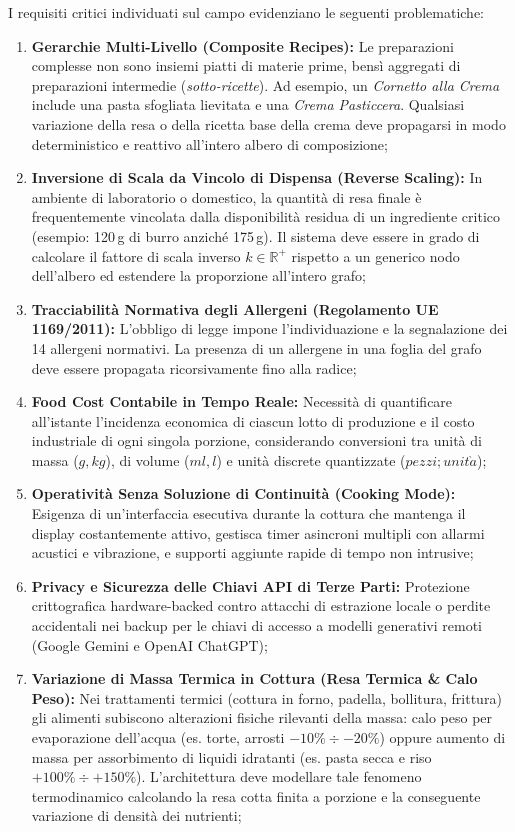 \documentclass[11pt,a4paper,titlepage]{article}
\begin{document}
I requisiti critici individuati sul campo evidenziano le seguenti problematiche:
\begin{enumerate}[leftmargin=*]
    \item \textbf{Gerarchie Multi-Livello (Composite Recipes):} Le preparazioni complesse non sono insiemi piatti di materie prime, bens\`i aggregati di preparazioni intermedie (\textit{sotto-ricette}). Ad esempio, un \textit{Cornetto alla Crema} include una pasta sfogliata lievitata e una \textit{Crema Pasticcera}. Qualsiasi variazione della resa o della ricetta base della crema deve propagarsi in modo deterministico e reattivo all'intero albero di composizione;
    \item \textbf{Inversione di Scala da Vincolo di Dispensa (Reverse Scaling):} In ambiente di laboratorio o domestico, la quantit\`a di resa finale \`e frequentemente vincolata dalla disponibilit\`a residua di un ingrediente critico (esempio: 120\,g di burro anzich\'e 175\,g). Il sistema deve essere in grado di calcolare il fattore di scala inverso $k \in \mathbb{R}^+$ rispetto a un generico nodo dell'albero ed estendere la proporzione all'intero grafo;
    \item \textbf{Tracciabilit\`a Normativa degli Allergeni (Regolamento UE 1169/2011):} L'obbligo di legge impone l'individuazione e la segnalazione dei 14 allergeni normativi. La presenza di un allergene in una foglia del grafo deve essere propagata ricorsivamente fino alla radice;
    \item \textbf{Food Cost Contabile in Tempo Reale:} Necessit\`a di quantificare all'istante l'incidenza economica di ciascun lotto di produzione e il costo industriale di ogni singola porzione, considerando conversioni tra unit\`a di massa ($g, kg$), di volume ($ml, l$) e unit\`a discrete quantizzate ($pezzi; unit\grave{a}$);
    \item \textbf{Operativit\`a Senza Soluzione di Continuit\`a (Cooking Mode):} Esigenza di un'interfaccia esecutiva durante la cottura che mantenga il display costantemente attivo, gestisca timer asincroni multipli con allarmi acustici e vibrazione, e supporti aggiunte rapide di tempo non intrusive;
    \item \textbf{Privacy e Sicurezza delle Chiavi API di Terze Parti:} Protezione crittografica hardware-backed contro attacchi di estrazione locale o perdite accidentali nei backup per le chiavi di accesso a modelli generativi remoti (Google Gemini e OpenAI ChatGPT);
    \item \textbf{Variazione di Massa Termica in Cottura (Resa Termica \& Calo Peso):} Nei trattamenti termici (cottura in forno, padella, bollitura, frittura) gli alimenti subiscono alterazioni fisiche rilevanti della massa: calo peso per evaporazione dell'acqua (es. torte, arrosti $-10\% \div -20\%$) oppure aumento di massa per assorbimento di liquidi idratanti (es. pasta secca e riso $+100\% \div +150\%$). L'architettura deve modellare tale fenomeno termodinamico calcolando la resa cotta finita a porzione e la conseguente variazione di densit\`a dei nutrienti;

\end{enumerate}
\end{document}
